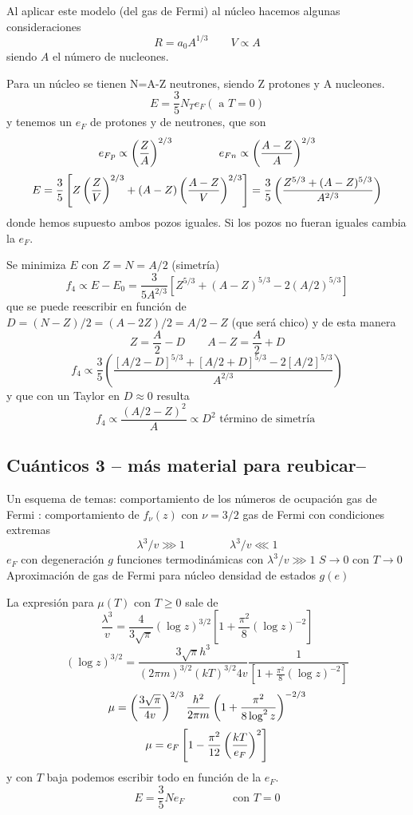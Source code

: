 \documentclass[10pt,oneside]{CBFT_book}
\begin{document}
Al aplicar este modelo (del gas de Fermi) al núcleo hacemos algunas consideraciones
\[
	R = a_0 A^{1/3} \qquad V \propto A 
\]
siendo $A$ el número de nucleones.

Para un núcleo se tienen N=A-Z neutrones, siendo Z protones y A nucleones.
\[
	E = \frac{3}{5}N_Te_F (\text{ a } T=0)
\]
y tenemos un $e_F$ de protones y de neutrones, que son 
\[
	e_{Fp} \propto \left( \frac{ Z }{ A } \right)^{2/3} \qquad \qquad 
	e_{Fn} \propto \left( \frac{ A-Z }{ A } \right)^{2/3}
\]
\[
	E = \frac{3}{5}\left[ Z\left( \frac{ Z }{ V } \right)^{2/3} + (A-Z)\left( \frac{ A-Z }{ V } \right)^{2/3} \right] =
	\frac{3}{5}\left( \frac{  Z^{5/3} + (A-Z)^{5/3}  }{ A^{2/3} } \right)
\]
donde hemos supuesto ambos pozos iguales. Si los pozos no fueran iguales cambia la
$e_F$.

Se minimiza $E$ con $Z=N=A/2$ (simetría)
\[
	f_4 \propto E-E_0 = \frac{3}{5A^{2/3}} \left[ Z^{5/3} + (A-Z)^{5/3} - 2(A/2)^{5/3} \right]
\]
que se puede reescribir en función de $D = (N-Z)/2 = (A - 2Z)/2 = A/2 - Z$ (que será chico) y
de esta manera 
\[
	Z = \frac{A}{2} - D \qquad A-Z = \frac{A}{2} + D
\]
\[
	f_4 \propto \frac{3}{5} \left( \frac{ [A/2 - D]^{5/3} + [A/2 + D]^{5/3} - 2[ A/2 ]^{5/3} }{A^{2/3}}\right)
\]
y que con un Taylor en $ D \approx 0 $ resulta 
\[
	f_4 \propto \frac{(A/2 - Z)^2}{A} \propto D^2 \text{ término de simetría }
\]

\subsection{Cuánticos 3 -- más material para reubicar--}

Un esquema de temas:
comportamiento de los números de ocupación
gas de Fermi : comportamiento de $f_\nu(z)$ con $ \nu = 3/2 $
gas de Fermi con condiciones extremas
\[
	\lambda^3 / v \ggg 1 \qquad \qquad \lambda^3 / v \lll 1
\]
$e_F$ con degeneración $g$
funciones termodinámicas con $\lambda^3 / v \ggg 1$ $ S \to 0 $ con $ T\to 0$
Aproximación de gas de Fermi para núcleo
densidad de estados $g(e)$


La expresión para $ \mu(T) $ con $ T \geq 0 $ sale de 
\[
	\frac{\lambda^3}{v} =  
	\frac{4}{3\sqrt{\pi} } (\log z )^{3/2} \left[ 1 + \frac{\pi^2}{8}(\log z )^{-2} \right] 
\]
\[
	( \log z )^{3/2} = \frac{ 3\sqrt{\pi} h^3 }{ ( 2 \pi m )^{3/2} (kT)^{3/2} 4v }   
	\frac{1}{\left[ 1 + \frac{\pi^2}{8}(\log z )^{-2} \right] }
\]
\[
	\mu = \left( \frac{ 3 \sqrt{\pi}  }{ 4v } \right)^{2/3} \frac{h^2}{2\pi m}
	\left( 1 + \frac{\pi^2}{8\log^2 z}\right)^{-2/3}
\]
\[
	\mu = e_F \left[ 1 - \frac{\pi^2}{12} \left( \frac{ kT }{ e_F } \right)^2 \right]
\]
y con $T$ baja podemos escribir todo en función de la $e_F$.
\[
	E = \frac{3}{5}Ne_F \qquad \qquad \text{ con } T=0
\]
\end{document}
